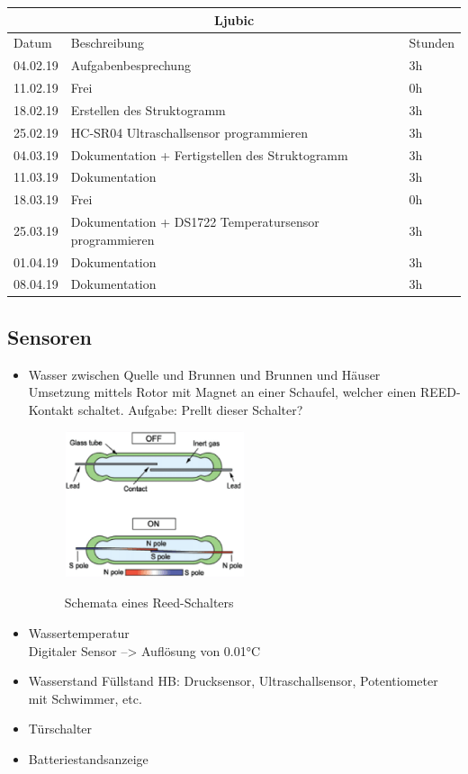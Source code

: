 \documentclass[12pt,a4paper]{article}
\begin{document}
\begin{table}[H]
\centering 
\begin{tabular}{|l|l|l|}
\hline
\multicolumn{3}{|c|}{Ljubic}   \\ \hline
Datum & Beschreibung & Stunden \\ \hline
04.02.19 & Aufgabenbesprechung & 3h \\ \hline
11.02.19 & Frei & 0h \\ \hline
18.02.19 & Erstellen des Struktogramm  & 3h \\ \hline
25.02.19 & HC-SR04 Ultraschallsensor programmieren & 3h \\ \hline
04.03.19 & Dokumentation + Fertigstellen des Struktogramm & 3h \\ \hline
11.03.19 & Dokumentation & 3h \\ \hline
18.03.19 & Frei & 0h\\ \hline
25.03.19 & Dokumentation + DS1722 Temperatursensor programmieren & 3h \\ \hline
01.04.19 & Dokumentation & 3h \\ \hline
08.04.19 & Dokumentation & 3h \\ \hline
\end{tabular}
\end{table}

\subsection{Sensoren}

\begin{itemize}
	\item{Wasser zwischen Quelle und Brunnen und Brunnen und Häuser} \\
	 Umsetzung mittels Rotor mit Magnet an einer Schaufel, welcher einen
	 REED-Kontakt schaltet. Aufgabe: Prellt dieser Schalter?
	 \begin{figure}[H]
		\centering
		\includegraphics[width=0.5\textwidth]{Reed.png}
		\label{fig:reed}
		\caption{Schemata eines Reed-Schalters}
	\end{figure}

	\item{Wassertemperatur} \\
	Digitaler Sensor --> Auflösung von 0.01°C

	\item{Wasserstand}
	Füllstand HB: Drucksensor, Ultraschallsensor, Potentiometer mit
	Schwimmer, etc.

	\item{Türschalter}
	\item{Batteriestandsanzeige}


\end{itemize}
\end{document}
